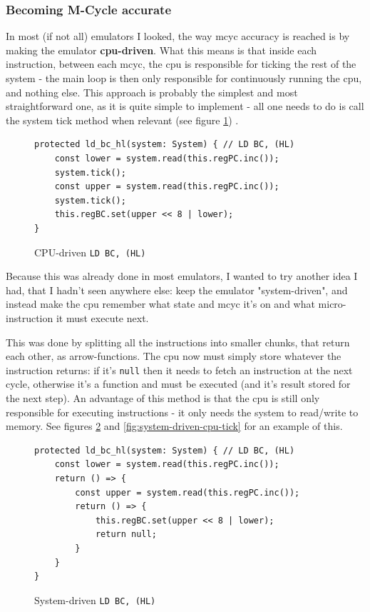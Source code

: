 \documentclass[11pt]{report}
\begin{document}
\subsubsection{Becoming M-Cycle accurate}

In most (if not all) emulators I looked, the way \gls{mcyc} accuracy is reached is by making the emulator \textbf{\gls{cpu}-driven}. What this means is that inside each instruction, between each \gls{mcyc}, the \gls{cpu} is responsible for ticking the rest of the system - the main loop is then only responsible for continuously running the \gls{cpu}, and nothing else. This approach is probably the simplest and most straightforward one, as it is quite simple to implement - all one needs to do is call the system tick method when relevant (see figure \ref{fig:cpu-driven-ld}) .

\begin{figure}[h]
    \begin{verbatim}
protected ld_bc_hl(system: System) { // LD BC, (HL)
    const lower = system.read(this.regPC.inc());
    system.tick();
    const upper = system.read(this.regPC.inc());
    system.tick();
    this.regBC.set(upper << 8 | lower);
}
    \end{verbatim}
    \caption{CPU-driven \texttt{LD BC, (HL)}}
    \label{fig:cpu-driven-ld}
\end{figure}

Because this was already done in most emulators, I wanted to try another idea I had, that I hadn't seen anywhere else: keep the emulator "system-driven", and instead make the \gls{cpu} remember what state and \gls{mcyc} it's on and what micro-instruction it must execute next.

This was done by splitting all the instructions into smaller chunks, that return each other, as arrow-functions. The \gls{cpu} now must simply store whatever the instruction returns: if it's \texttt{null} then it needs to fetch an instruction at the next cycle, otherwise it's a function and must be executed (and it's result stored for the next step). An advantage of this method is that the \gls{cpu} is still only responsible for executing instructions - it only needs the system to read/write to memory. See figures \ref{fig:system-driven-ld} and \ref{fig:system-driven-cpu-tick} for an example of this.

\begin{figure}[h]
    \begin{verbatim}
protected ld_bc_hl(system: System) { // LD BC, (HL)
    const lower = system.read(this.regPC.inc());
    return () => {
        const upper = system.read(this.regPC.inc());
        return () => {
            this.regBC.set(upper << 8 | lower);
            return null;
        }
    }
}
    \end{verbatim}
    \caption{System-driven \texttt{LD BC, (HL)}}
    \label{fig:system-driven-ld}
\end{figure}
\end{document}
